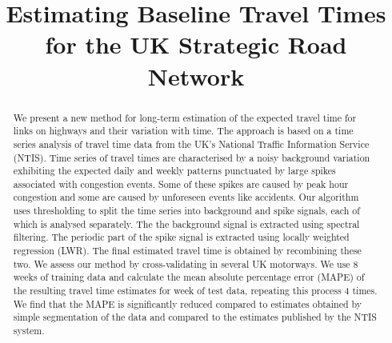 \documentclass[conference, letterpaper]{IEEEtran}
\begin{document}
\title{Estimating Baseline Travel Times for the UK Strategic Road Network
}

\author{
\and
{}
\and
{}
}

\maketitle

\begin{abstract}
We present a new method for long-term estimation of the expected travel time for links on highways and their variation with time.  
The approach is based on a time series analysis of travel time data from the UK's National Traffic Information Service (NTIS).  
Time series of travel times are characterised by a noisy background variation exhibiting the expected daily and weekly patterns punctuated by large spikes associated with congestion events. 
Some of these spikes are caused by peak hour congestion and some are caused by unforeseen events like accidents. 
Our algorithm uses thresholding to split the time series into background and spike signals, each of which is analysed separately. 
The the background signal is extracted using spectral filtering. 
The periodic part of the spike signal is extracted using locally weighted regression (LWR). 
The final estimated travel time is obtained by recombining these two. 
We assess our method by cross-validating in several UK motorways. 
We use 8 weeks of training data and calculate the mean absolute percentage error (MAPE) of the resulting travel time estimates for week of test data, repeating this process 4 times. 
We find that the MAPE is significantly reduced compared to estimates obtained by simple segmentation of the data and compared to the estimates published by the NTIS system.
\end{abstract}
\end{document}
